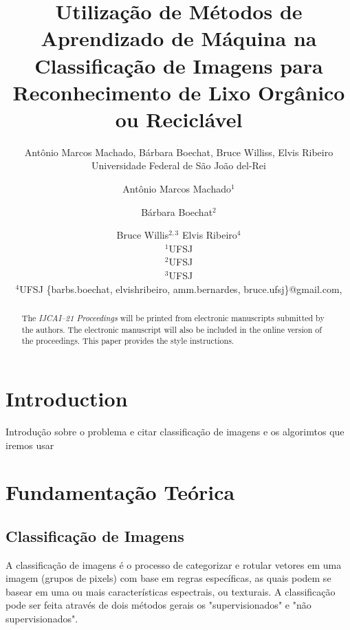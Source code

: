 \documentclass{article}
\title{Utilização de Métodos de Aprendizado de Máquina na Classificação de Imagens para
Reconhecimento de Lixo Orgânico ou Reciclável}
\author{
    Antônio Marcos Machado, Bárbara Boechat, Bruce Williss, Elvis Ribeiro
    \affiliations
    Universidade Federal de São João del-Rei
    \emails
}
\author{
Antônio Marcos Machado$^1$
\and
Bárbara Boechat$^2$\and
Bruce Willis$^{2,3}$\And
Elvis Ribeiro$^4$

\affiliations
$^1$UFSJ\\
$^2$UFSJ\\
$^3$UFSJ\\
$^4$UFSJ
\emails
\{barbs.boechat, elvishribeiro, amm.bernardes, bruce.ufsj\}@gmail.com,
}
\begin{document}
\maketitle



\begin{abstract}
  The {\it IJCAI--21 Proceedings} will be printed from electronic
  manuscripts submitted by the authors. The electronic manuscript will
  also be included in the online version of the proceedings. This paper
  provides the style instructions.
\end{abstract}

\section{Introduction}

Introdução sobre o problema e citar classificação de imagens e os algorimtos que iremos usar

\section{Fundamentação Teórica}

\subsection{Classificação de Imagens}
A classificação de imagens é o processo de categorizar e rotular vetores em uma imagem (grupos de pixels) com base em regras específicas, as quais podem se basear em uma ou mais características espectrais, ou texturais. A classificação pode ser feita através de dois métodos gerais os "supervisionados" e "não supervisionados". %
\end{document}
